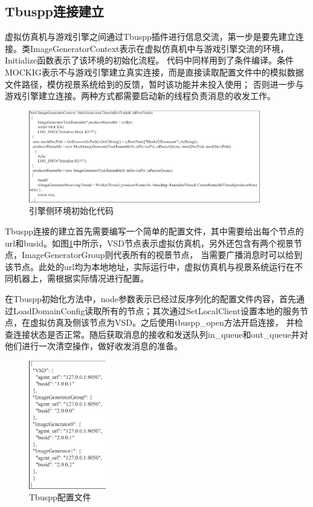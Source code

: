 \subsection{Tbuspp连接建立}
虚拟仿真机与游戏引擎之间通过Tbuspp插件进行信息交流，第一步是要先建立连接。类ImageGeneratorContext表示在虚拟仿真机中与游戏引擎交流的环境，Initialize函数表示了该环境的初始化流程。
代码中同样用到了条件编译。条件MOCKIG表示不与游戏引擎建立真实连接，而是直接读取配置文件中的模拟数据文件路径，模仿视景系统给到的反馈，暂时该功能并未投入使用；
否则进一步与游戏引擎建立连接。两种方式都需要启动新的线程负责消息的收发工作。
\begin{figure}[h!]
    \begin{center}
        \includegraphics[width=0.9\textwidth]{pictures/code17.pdf}
        \caption{引擎侧环境初始化代码}
    \end{center}
\end{figure}
\par
Tbuspp连接的建立首先需要编写一个简单的配置文件，其中需要给出每个节点的url和busid。如图\ref{tbusconfi}中所示，VSD节点表示虚拟仿真机，另外还包含有两个视景节点，ImageGeneratorGroup则代表所有的视景节点，
当需要广播消息时可以给到该节点。此处的url均为本地地址，实际运行中，虚拟仿真机与视景系统运行在不同机器上，需根据实际情况进行配置。
\par
在Tbuspp初始化方法中，node参数表示已经过反序列化的配置文件内容，首先通过LoadDomainConfig读取所有的节点；其次通过SetLocalClient设置本地的服务节点，在虚拟仿真及侧该节点为VSD。之后使用tbuspp\_open方法开启连接，
并检查连接状态是否正常。随后获取消息的接收和发送队列in\_queue和out\_queue并对他们进行一次清空操作，做好收发消息的准备。
\clearpage
\begin{figure}[h!]
    \begin{center}
        \includegraphics[width=0.3\textwidth]{pictures/code18.pdf}
        \caption{Tbuspp配置文件}
        \label{tbusconfi}
    \end{center}
\end{figure}
